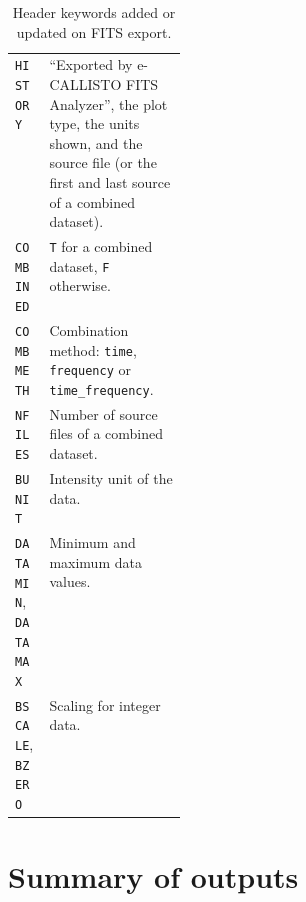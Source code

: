 \begin{table}[!htbp]
  \centering
  \caption{Header keywords added or updated on FITS export.}
  \label{tab:fits-keywords}
  \small
  \begin{tabularx}{\linewidth}{@{}P{0.2\linewidth}L@{}}
    \toprule
     &  \\
    \midrule
    \texttt{HISTORY} & ``Exported by e-CALLISTO FITS Analyzer'', the plot type, the units shown, and the source file (or the first and last source of a combined dataset). \\
    \texttt{COMBINED} & \texttt{T} for a combined dataset, \texttt{F} otherwise. \\
    \texttt{COMBMETH} & Combination method: \texttt{time}, \texttt{frequency} or \texttt{time\_frequency}. \\
    \texttt{NFILES} & Number of source files of a combined dataset. \\
    \texttt{BUNIT} & Intensity unit of the data. \\
    \texttt{DATAMIN}, \texttt{DATAMAX} & Minimum and maximum data values. \\
    \texttt{BSCALE}, \texttt{BZERO} & Scaling for integer data. \\
    \bottomrule
  \end{tabularx}
\end{table}

\section{Summary of outputs}

